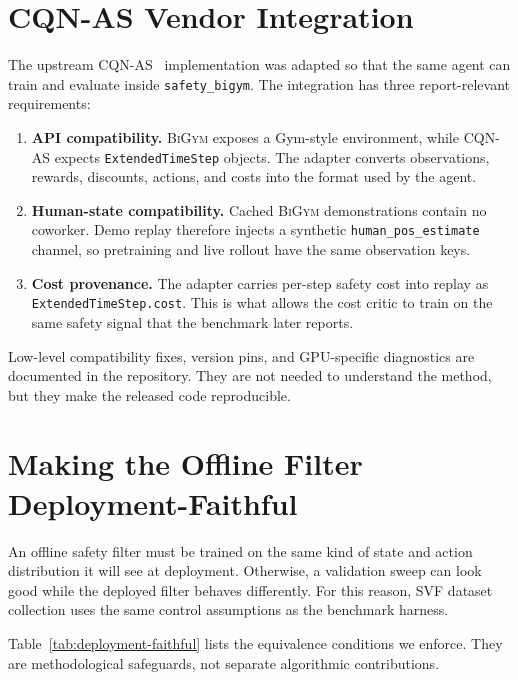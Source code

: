 \documentclass[11pt,a4paper]{report}
\newcommand{\bigym}{\textsc{BiGym}}
\newcommand{\sbigym}{\texttt{safety\_bigym}}
\newcommand{\cqnas}{CQN-AS}
\begin{document}
\section{\cqnas{} Vendor Integration}
\label{sec:impl:integration}

The upstream \cqnas{}~\cite{seo2024cqnas} implementation was adapted
so that the same agent can train and evaluate inside \sbigym{}. The
integration has three report-relevant requirements:

\begin{enumerate}[topsep=2pt,itemsep=2pt]
\item \textbf{API compatibility.} \bigym{} exposes a Gym-style
  environment, while \cqnas{} expects \texttt{ExtendedTimeStep}
  objects. The adapter converts observations, rewards, discounts,
  actions, and costs into the format used by the agent.
\item \textbf{Human-state compatibility.} Cached \bigym{}
  demonstrations contain no coworker. Demo replay therefore injects a
  synthetic \texttt{human\_pos\_estimate} channel, so pretraining and
  live rollout have the same observation keys.
\item \textbf{Cost provenance.} The adapter carries per-step safety
  cost into replay as \texttt{ExtendedTimeStep.cost}. This is what
  allows the cost critic to train on the same safety signal that the
  benchmark later reports.
\end{enumerate}

Low-level compatibility fixes, version pins, and GPU-specific
diagnostics are documented in the repository. They are not needed to
understand the method, but they make the released code reproducible.

\section{Making the Offline Filter Deployment-Faithful}
\label{sec:impl:svf-faithful}

An offline safety filter must be trained on the same kind of state and
action distribution it will see at deployment. Otherwise, a validation
sweep can look good while the deployed filter behaves differently. For
this reason, SVF dataset collection uses the same control assumptions
as the benchmark harness.

Table~\ref{tab:deployment-faithful} lists the equivalence conditions we
enforce. They are methodological safeguards, not separate algorithmic
contributions.
\end{document}
